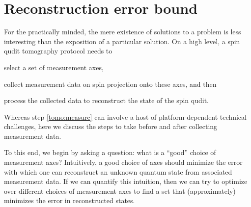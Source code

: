 \documentclass[notitlepage,twocolumn]{revtex4-2}
\begin{document}
\section{Reconstruction error bound}
\label{sec:bound}

For the practically minded, the mere existence of solutions to a problem is less interesting than the exposition of a particular solution.
On a high level, a spin qudit tomography protocol needs to
\begin{enumerate*}
\item select a set of measurement axes,
\item collect measurement data on spin projection onto these axes, and then
  \label{tomo:measure}
\item process the collected data to reconstruct the state of the spin qudit.
\end{enumerate*}
Whereas step \ref{tomo:measure} can involve a host of platform-dependent technical challenges, here we discuss the steps to take before and after collecting measurement data.

To this end, we begin by asking a question: what is a ``good'' choice of measurement axes?
Intuitively, a good choice of axes should minimize the error with which one can reconstruct an unknown quantum state from associated measurement data.
If we can quantify this intuition, then we can try to optimize over different choices of measurement axes to find a set that (approximately) minimizes the error in reconstructed states.
\end{document}
